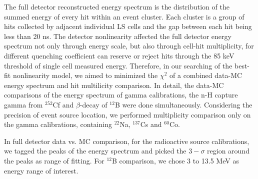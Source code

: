 \label{sec:fulldet}
The full detector reconstructed energy spectrum is the distribution of the summed energy of every hit within an event cluster. 
Each cluster is a group of hits collected by adjacent individual LS cells and the gap between each hit being less than 20 ns.
The detector nonlinearity affected the full detector energy spectrum not only through energy scale, but also through cell-hit multiplicity, for different quenching coefficient can reserve or reject hits through the 85 keV threshold of single cell measured energy.
Therefore, in our searching of the best-fit nonlinearity model, we aimed to minimized the $\chi^2$ of a combined data-MC energy spectrum and hit multilicity comparison. 
In detail, the data-MC comparisons of the energy spectrum of gamma calibrations, the n-H capture gamma from $^{252}$Cf and $\beta$-decay of $^{12}$B were done simultaneously.
Considering the precision of event source location, we performed multiplicity comparison only on the gamma calibrations, containing $^{22}$Na, $^{137}$Cs and $^{60}$Co.



In full detector data vs. MC comparison, for the radioactive source calibrations, we tagged the peaks of the energy spectrum and picked the $3-\sigma$ region around the peaks as range of fitting. 
For $^{12}$B comparison, we chose 3 to 13.5 MeV as energy range of interest.

